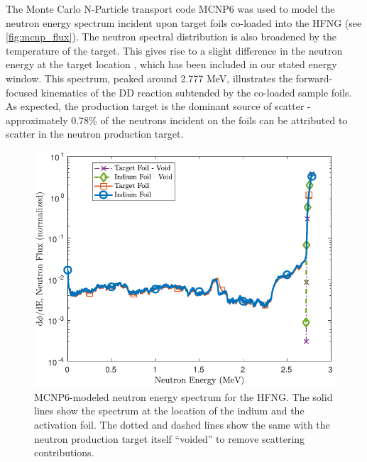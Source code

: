 \documentclass[5p]{elsarticle}
\newcommand{\comment}[1]{\todo[color=blue!20!white,inline]{ASV: #1}}
\begin{document}

The Monte Carlo N-Particle transport code  MCNP6 \cite{goorley2013initial} was used to model the neutron energy spectrum incident upon target foils co-loaded into the HFNG (see \autoref{fig:mcnp_flux}).
The neutron spectral distribution is also broadened by the temperature of the target.  
This gives rise to a slight difference in the neutron energy at the target location \cite{Waltz2016a}, which has been included in our stated energy window.
This spectrum, peaked around 2.777 MeV, illustrates the forward-focused kinematics of the DD reaction subtended by the co-loaded sample foils.
 As expected, the  production target is the dominant source of scatter - approximately 0.78\%  of the neutrons incident on the foils can be attributed to scatter in the neutron production target.  
 




\begin{figure}
 \centering
 \includegraphics[scale=0.6]{./figures/mcnp_flux_new.pdf}
 \caption{MCNP6-modeled neutron energy spectrum for the HFNG.  The solid lines show the spectrum at the location of the indium and the activation foil. The dotted and dashed lines show the same with the neutron production target itself \enquote{voided} to remove scattering contributions.  }
 \label{fig:mcnp_flux}
\end{figure}
\end{document}

